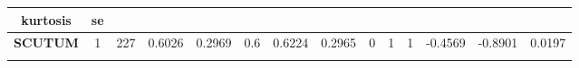 \begin{longtable}[]{@{}cccccccccccccc@{}}
\begin{minipage}[b]{0.06\columnwidth}
kurtosis\strut
\end{minipage} & \begin{minipage}[b]{0.06\columnwidth}\centering\strut
se\strut
\end{minipage}\tabularnewline
\midrule
\endhead
\begin{minipage}[t]{0.07\columnwidth}\centering\strut
\textbf{SCUTUM}\strut
\end{minipage} & \begin{minipage}[t]{0.04\columnwidth}\centering\strut
1\strut
\end{minipage} & \begin{minipage}[t]{0.03\columnwidth}\centering\strut
227\strut
\end{minipage} & \begin{minipage}[t]{0.05\columnwidth}\centering\strut
0.6026\strut
\end{minipage} & \begin{minipage}[t]{0.05\columnwidth}\centering\strut
0.2969\strut
\end{minipage} & \begin{minipage}[t]{0.05\columnwidth}\centering\strut
0.6\strut
\end{minipage} & \begin{minipage}[t]{0.05\columnwidth}\centering\strut
0.6224\strut
\end{minipage} & \begin{minipage}[t]{0.05\columnwidth}\centering\strut
0.2965\strut
\end{minipage} & \begin{minipage}[t]{0.03\columnwidth}\centering\strut
0\strut
\end{minipage} & \begin{minipage}[t]{0.03\columnwidth}\centering\strut
1\strut
\end{minipage} & \begin{minipage}[t]{0.04\columnwidth}\centering\strut
1\strut
\end{minipage} & \begin{minipage}[t]{0.05\columnwidth}\centering\strut
-0.4569\strut
\end{minipage} & \begin{minipage}[t]{0.06\columnwidth}\centering\strut
-0.8901\strut
\end{minipage} & \begin{minipage}[t]{0.06\columnwidth}\centering\strut
0.0197\strut
\end{minipage}\tabularnewline
\begin{minipage}[t]{0.07\columnwidth}\centering\strut

\end{minipage}
\end{longtable}
